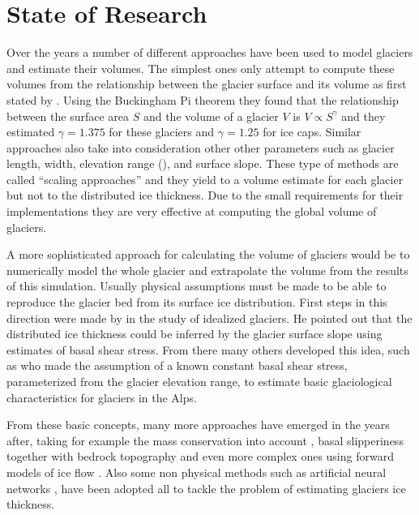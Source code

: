\section{State of Research}\label{research}
Over the years a number of different approaches have been used to model glaciers and estimate their volumes.
The simplest ones only attempt to compute these volumes from the relationship between the glacier surface and its volume as first stated by \citet{bahr1997}. Using the Buckingham Pi
theorem they found that the relationship between the surface area $S$ and the volume of a glacier $V$ is $V \propto S^{\gamma}$ and they estimated $\gamma=1.375$ for these glaciers and $\gamma=1.25$ for ice caps. Similar approaches also take into consideration other other parameters such as glacier length, width, elevation range (\citet{Grinsted2013}), and surface slope. These type of methods are called ``scaling approaches'' and they yield to a volume estimate for each glacier but not to the distributed ice thickness. Due to the small requirements for their implementations they are very effective at computing the global volume of glaciers.

A more sophisticated approach for calculating the volume of glaciers would be to numerically model the whole glacier and extrapolate the volume from the results of this simulation. Usually physical assumptions must be made to be able to reproduce the glacier bed from its surface ice distribution.
First steps in this direction were made by \citet{Nye1965} in the study of  idealized glaciers. He pointed out that the distributed ice thickness could be inferred by the glacier surface slope using estimates of basal shear stress. From there many others developed this idea, such as \citet{haeberli1995} who made the assumption of a known constant basal shear stress, parameterized from the glacier elevation range, to estimate basic glaciological characteristics for glaciers in the Alps. 

From these basic concepts, many more approaches have emerged in the years after, taking for example the mass conservation into account \citet{rasmussen_1988}, basal slipperiness together with bedrock topography \citet{Gudmundsson2001} and even more complex ones using forward models of ice flow \citet{vanPelt2013}. Also some non physical methods such as artificial neural networks \citet{Clarke2009}, have been adopted all to tackle the problem of estimating glaciers ice thickness. 

